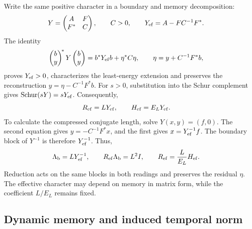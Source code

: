 Write the same positive character in a boundary and memory decomposition:
\[
 Y=\begin{pmatrix}A&F\\F^*&C\end{pmatrix},\qquad C>0,
 \qquad Y_{\rm ef}=A-FC^{-1}F^*.
\]
The identity
\[
 \begin{pmatrix}b\\y\end{pmatrix}^{\!*}Y
 \begin{pmatrix}b\\y\end{pmatrix}
 =b^*Y_{\rm ef}b+\eta^*C\eta,
 \qquad \eta=y+C^{-1}F^*b,
\]
proves \(Y_{\rm ef}>0\), characterizes the least-energy extension and preserves the reconstruction \(y=\eta-C^{-1}F^*b\). For \(s>0\), substitution into the Schur complement gives \(\operatorname{Schur}(sY)=sY_{\rm ef}\). Consequently,
\[
 R_{\rm ef}=LY_{\rm ef},\qquad
 H_{\rm ef}=E_{L}Y_{\rm ef}.
\]
To calculate the compressed conjugate length, solve \(Y(x,y)=(f,0)\). The second equation gives \(y=-C^{-1}F^*x\), and the first gives \(x=Y_{\rm ef}^{-1}f\). The boundary block of \(Y^{-1}\) is therefore \(Y_{\rm ef}^{-1}\). Thus,
\begin{equation}
 \Lambda_{\rm b}=LY_{\rm ef}^{-1},\qquad
 R_{\rm ef}\Lambda_{\rm b}=L^2I,\qquad
 R_{\rm ef}=\frac{L}{E_{L}}H_{\rm ef}.
 \label{g26:eq:schur-reciproco-es}
\end{equation}
Reduction acts on the same blocks in both readings and preserves the residual \(\eta\). The effective character may depend on memory in matrix form, while the coefficient \(L/E_{L}\) remains fixed.

\subsection{Dynamic memory and induced temporal norm}

